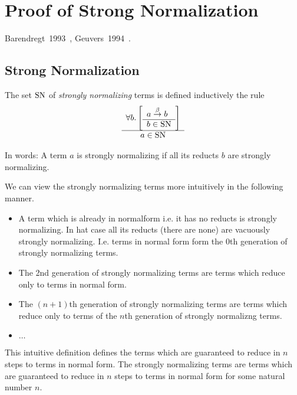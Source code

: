 \section{Proof of Strong Normalization}

Barendregt~1993~\cite{barendregt1993}, Geuvers~1994~\cite{geuvers1994}.





\subsection{Strong Normalization}

\begin{definition}
    The set $\text{SN}$ of \emph{strongly normalizing} terms is defined inductively
    the rule
    $$
        \begin{array}{c} 
            \forall b. \left[ \begin{array}{l} a \stackrel{\beta}{\to} b \\ \hline b \in \text{SN}\end{array} \right]
         \\ \hline 
            a \in \text{SN}
        \end{array}
    $$
\end{definition}

In words: A term $a$ is strongly normalizing if all its reducts $b$ are strongly
normalizing.

We can view the strongly normalizing terms more intuitively in the following
manner.

\begin{itemize}

    \item A term which is already in normalform i.e. it has no reducts is
        strongly normalizing. In hat case all its reducts (there are none) are
        vacuously strongly normalizing. I.e. terms in normal form form the
        $0$th generation of strongly normalizing terms.

    \item The 2nd generation of strongly normalizing terms are terms which
        reduce only to terms in normal form.

    \item The $(n+1)$th generation of strongly normalizing terms are terms which
        reduce only to terms of the $n$th generation of strongly normalizng
        terms.

    \item $\ldots$

\end{itemize}

This intuitive definition defines the terms which are guaranteed to reduce in
$n$ steps to terms in normal form. The strongly normalizing terms are terms
which are guaranteed to reduce in $n$ steps to terms in normal form for some
natural number $n$.

